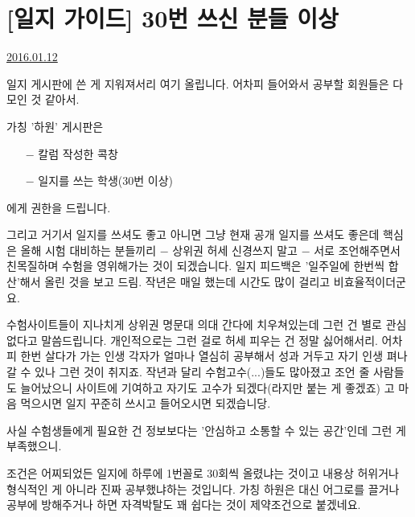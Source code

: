 \section{[일지 가이드] 30번 쓰신 분들 이상}
\href{https://www.kockoc.com/Apoc/586339}{2016.01.12}

\vspace{5mm}

일지 게시판에 쓴 게 지워져서리 여기 올립니다.
어차피 들어와서 공부할 회원들은 다 모인 것 같아서.
\vspace{5mm}

가칭 '하원' 게시판은
\vspace{5mm}

\begin{itemize}
    \item[$-$] 칼럼 작성한 콕창
    \item[$-$] 일지를 쓰는 학생(30번 이상)
\end{itemize}
\vspace{5mm}

에게 권한을 드립니다.
\vspace{5mm}

그리고 거기서 일지를 쓰셔도 좋고 아니면 그냥 현재 공개 일지를 쓰셔도 좋은데
핵심은 올해 시험 대비하는 분들끼리 $-$ 상위권 허세 신경쓰지 말고 $-$ 서로 조언해주면서 친목질하며 수험을 영위해가는 것이 되겠습니다.
일지 피드백은 '일주일에 한번씩 합산'해서 올린 것을 보고 드림.
작년은 매일 했는데 시간도 많이 걸리고 비효율적이더군요.
\vspace{5mm}

수험사이트들이 지나치게 상위권 명문대 의대 간다에 치우쳐있는데
그런 건 별로 관심없다고 말씀드립니다. 개인적으로는 그런 걸로 허세 피우는 건 정말 싫어해서리.
어차피 한번 살다가 가는 인생 각자가 얼마나 열심히 공부해서 성과 거두고 자기 인생 펴나갈 수 있나 그런 것이 취지죠.
작년과 달리 수험고수(...)들도 많아졌고 조언 줄 사람들도 늘어났으니 사이트에 기여하고 자기도 고수가 되겠다(라지만 붙는 게 좋겠죠)
고 마음 먹으시면 일지 꾸준히 쓰시고 들어오시면 되겠습니당.
\vspace{5mm}

사실 수험생들에게 필요한 건 정보보다는 '안심하고 소통할 수 있는 공간'인데
그런 게 부족했으니.
\vspace{5mm}

조건은 어찌되었든 일지에 하루에 1번꼴로 30회씩 올렸냐는 것이고
내용상 허위거나 형식적인 게 아니라 진짜 공부했냐하는 것입니다.
가칭 하원은 대신 어그로를 끌거나 공부에 방해주거나 하면 자격박탈도 꽤 쉽다는 것이 제약조건으로 붙겠네요.
\vspace{5mm}

